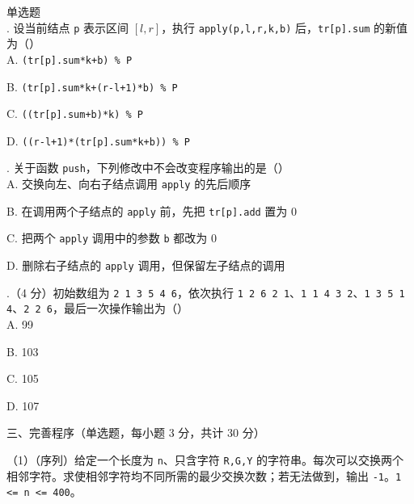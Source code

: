 \documentclass[a4paper]{ctexart}
\newcommand{\wdot}{{\fontsize{12}{12}\selectfont\textbullet}}
\newcommand{\bigtitle}[1]{\noindent\heiti #1\par\vspace{2pt}}
\newcommand{\q}[1]{\noindent #1}
\newcommand{\opt}[1]{\hspace*{2em} #1\par}
\begin{document}
\noindent\wdot\hspace{0.5em}单选题\\
\q{30.} 设当前结点 \texttt{p} 表示区间 \([l,r]\)，执行 \texttt{apply(p,l,r,k,b)} 后，\texttt{tr[p].sum} 的新值为（\qquad）\\
\opt{A. \texttt{(tr[p].sum*k+b) \% P}}
\opt{B. \texttt{(tr[p].sum*k+(r-l+1)*b) \% P}}
\opt{C. \texttt{((tr[p].sum+b)*k) \% P}}
\opt{D. \texttt{((r-l+1)*(tr[p].sum*k+b)) \% P}}
\q{31.} 关于函数 \texttt{push}，下列修改中不会改变程序输出的是（\qquad）\\
\opt{A. 交换向左、向右子结点调用 \texttt{apply} 的先后顺序}
\opt{B. 在调用两个子结点的 \texttt{apply} 前，先把 \texttt{tr[p].add} 置为 0}
\opt{C. 把两个 \texttt{apply} 调用中的参数 \texttt{b} 都改为 0}
\opt{D. 删除右子结点的 \texttt{apply} 调用，但保留左子结点的调用}
\q{32.}（4 分）初始数组为 \texttt{2 1 3 5 4 6}，依次执行 \texttt{1 2 6 2 1}、\texttt{1 1 4 3 2}、\texttt{1 3 5 1 4}、\texttt{2 2 6}，最后一次操作输出为（\qquad）\\
\opt{A. 99}\opt{B. 103}\opt{C. 105}\opt{D. 107}
\clearpage
\bigtitle{三、完善程序（单选题，每小题 3 分，共计 30 分）}

\noindent（1）（序列）给定一个长度为 \texttt{n}、只含字符 \texttt{R,G,Y} 的字符串。每次可以交换两个相邻字符。求使相邻字符均不同所需的最少交换次数；若无法做到，输出 \texttt{-1}。\texttt{1 <= n <= 400}。
\end{document}
